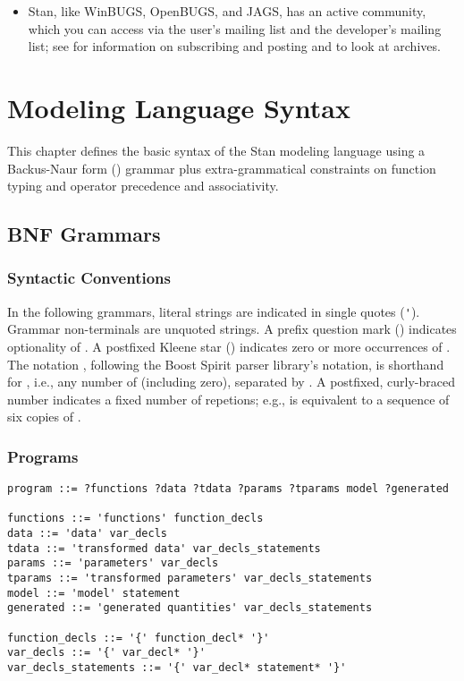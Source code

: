 \begin{itemize}
\item Stan, like WinBUGS, OpenBUGS, and JAGS, has an active community,
  which you can access via the user's mailing list and the developer's
  mailing list; see  for information on
  subscribing and posting and to look at archives.
\end{itemize}

\chapter{Modeling Language Syntax}

\noindent
This chapter defines the basic syntax of the Stan modeling language
using a Backus-Naur form (\BNF) grammar plus extra-grammatical
constraints on function typing and operator precedence and
associativity.

\section{BNF Grammars}

\subsection{Syntactic Conventions}

In the following \BNF grammars, literal strings are indicated in
single quotes (\Verb|'|).  Grammar non-terminals are unquoted strings.
A prefix question mark () indicates optionality of .
A postfixed Kleene star () indicates zero or more occurrences
of .  The notation , following the Boost Spirit
parser library's notation, is shorthand for , i.e.,
any number of  (including zero), separated by .  A
postfixed, curly-braced number indicates a fixed number of repetions;
e.g.,  is equivalent to a sequence of six copies of .

\subsection{Programs}

{\small
\begin{Verbatim}
program ::= ?functions ?data ?tdata ?params ?tparams model ?generated

functions ::= 'functions' function_decls
data ::= 'data' var_decls
tdata ::= 'transformed data' var_decls_statements
params ::= 'parameters' var_decls
tparams ::= 'transformed parameters' var_decls_statements
model ::= 'model' statement
generated ::= 'generated quantities' var_decls_statements

function_decls ::= '{' function_decl* '}'
var_decls ::= '{' var_decl* '}'
var_decls_statements ::= '{' var_decl* statement* '}'
\end{Verbatim}
}

